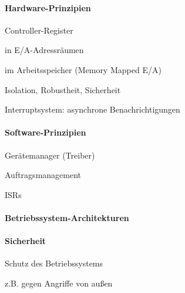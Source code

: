 \documentclass[a4pape]{article}
\begin{document}
\begin{multicols}{3}
  \paragraph{Hardware-Prinzipien}
  \begin{itemize*}
    \item\item Controller-Register
    \begin{itemize*}
      \item\item in E/A-Adressräumen
      \item im Arbeitsspeicher (Memory Mapped E/A)
      \item Isolation, Robustheit, Sicherheit
    \end{itemize*}
    \item Interruptsystem: asynchrone Benachrichtigungen
  \end{itemize*}

  \paragraph{Software-Prinzipien}
  Gerätemanager (Treiber)
  \begin{itemize*}
    \item\item Auftragsmanagement
    \item ISRs
  \end{itemize*}

  \paragraph{Betriebssystem-Architekturen}

  \paragraph{Sicherheit}
  \begin{itemize*}
    \item\item Schutz des Betriebssystems
    \item z.B. gegen Angriffe von außen
  \end{itemize*}


\end{multicols}
\end{document}
